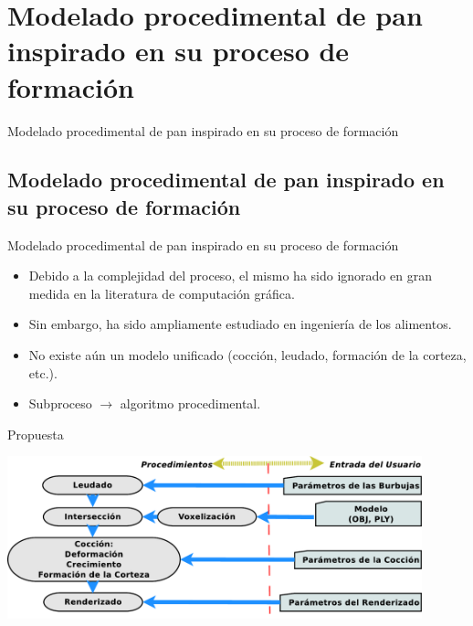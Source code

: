 \documentclass[spanish,unknownkeysallowed,10pt]{beamer}
\begin{document}
\section[Modelado de Pan]{Modelado procedimental de pan inspirado en su proceso de formación}


\begin{frame}
\begin{block}{}
\begin{center}
\vspace{1cm}
\huge{Modelado procedimental de pan inspirado en su proceso de formación}
\vspace{1cm}
\end{center}
\end{block}
\end{frame}

\subsection{Modelado procedimental de pan inspirado en su proceso de formación}
\begin{frame}{Modelado procedimental de pan inspirado en su proceso de formación}
\begin{block}{}
\begin{itemize}
\item Debido a la complejidad del proceso, el mismo ha sido ignorado en gran medida en la literatura de computación gráfica.

\item Sin embargo, ha sido ampliamente estudiado en ingeniería de los alimentos.

\item No existe aún un modelo unificado (cocción, leudado, formación de la corteza, etc.).

\item Subproceso $\rightarrow$ algoritmo procedimental.
\end{itemize}
\end{block}
\end{frame}

\begin{frame}{Propuesta}
\centerline{\includegraphics[width=12cm]{../figures/pipeline}}
\end{frame}
\end{document}
